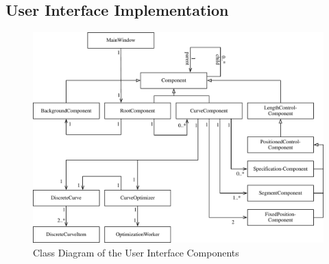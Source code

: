 \documentclass[a4paper]{article}
\begin{document}
					
			\subsection{User Interface Implementation}
				\begin{figure}[htb]
					\centering
					\includegraphics[width=\textwidth]{content/output/ui_components_class_diagram.pdf}
					\caption{Class Diagram of the User Interface Components}
					\label{figure:ui_components_class_diagram}
				\end{figure}
				
\end{document}
